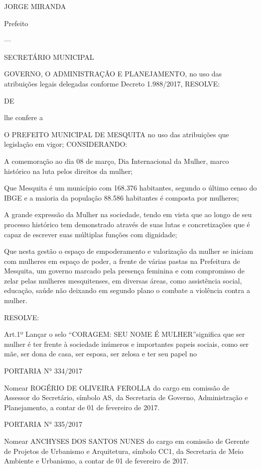 \documentclass{doliberto}
\begin{document}
JORGE MIRANDA 

Prefeito 

---

SECRETÁRIO  MUNICIPAL 

GOVERNO, 
O 
ADMINISTRAÇÃO  E  PLANEJAMENTO,  no  uso  das 
atribuições legais delegadas conforme Decreto 1.988/2017, 
RESOLVE: 

DE 

lhe  confere  a 

O  PREFEITO  MUNICIPAL  DE  MESQUITA  no  uso  das 
atribuições  que 
legislação  em  vigor; 
CONSIDERANDO: 
 
A  comemoração  ao  dia  08  de  março,  Dia  Internacional  da 
Mulher, marco histórico na luta pelos direitos da mulher; 
 
Que  Mesquita  é  um  município  com  168.376  habitantes, 
segundo o último censo do  IBGE e a  maioria da população 
88.586 habitantes é composta por mulheres; 
 
A grande expressão da Mulher na sociedade, tendo em vista 
que  ao  longo  de  seu  processo  histórico  tem  demonstrado 
através  de  suas  lutas  e  concretizações  que  é  capaz  de 
escrever suas múltiplas funções com dignidade; 

Que nesta gestão o espaço de empoderamento e valorização 
da mulher se iniciam com mulheres em espaço de poder, a 
frente  de  várias  pastas  na  Prefeitura  de  Mesquita,  um 
governo  marcado  pela  presença 
feminina  e  com 
compromisso  de  zelar  pelas  mulheres  mesquitenses,  em 
diversas  áreas,  como  assistência  social,  educação,  saúde 
não  deixando  em  segundo  plano  o  combate  a  violência 
contra a mulher.  

RESOLVE:  

Art.1º  Lançar  o  selo 
“CORAGEM:  SEU  NOME  É 
MULHER”significa que ser mulher é ter frente à sociedade 
inúmeros  e  importantes  papeis  sociais,  como  ser  mãe,  ser 
dona  de  casa,  ser  esposa,  ser  zelosa  e  ter  seu  papel  no 

 

PORTARIA N° 334/2017 

Nomear  ROGÉRIO  DE  OLIVEIRA  FEROLLA  do  cargo  em 
comissão  de  Assessor  do  Secretário,  símbolo  AS,  da 
Secretaria  de  Governo,  Administração  e  Planejamento, 
a contar de 01 de fevereiro de 2017. 

PORTARIA N° 335/2017 

Nomear  ANCHYSES  DOS  SANTOS  NUNES  do  cargo  em 
comissão  de  Gerente  de  Projetos  de  Urbanismo  e 
Arquitetura,  símbolo  CC1,  da  Secretaria  de  Meio 
Ambiente  e  Urbanismo,  a  contar  de  01  de  fevereiro  de 
2017. 
\end{document}
